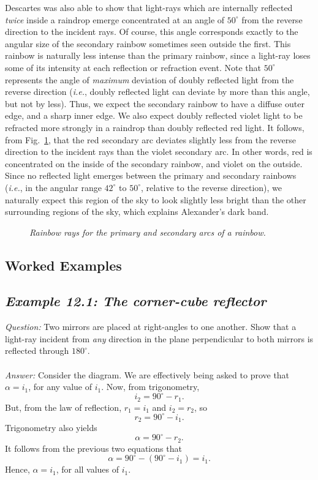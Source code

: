 Descartes was also able to show that light-rays which are
internally  reflected
{\em twice} inside a raindrop emerge concentrated at an
angle of $50^\circ$ from  the reverse direction to the incident
 rays. Of course,
this angle corresponds exactly to the angular size of the secondary
rainbow sometimes seen outside the first. This rainbow
is naturally less intense than the primary rainbow, since a
light-ray  loses some of its intensity at each reflection
or refraction event. Note that $50^\circ$ represents the
angle of {\em maximum}\/ deviation of doubly reflected light
from the reverse direction  ({\em i.e.}, doubly reflected
light can deviate by more than this angle, but not by less). Thus,
we expect the secondary rainbow to have a diffuse outer edge, and
a sharp inner edge. We  also expect doubly reflected violet light to be
refracted more strongly in a raindrop than 
doubly reflected red light. It follows, from Fig.~\ref{f12.15},
 that the red secondary arc deviates slightly less
from the reverse direction to the incident
 rays than the violet secondary arc.
In other words, red is concentrated on the inside of the
secondary rainbow, and violet  on the outside.
Since no reflected light emerges between the primary and secondary
rainbows ({\em i.e.}, in the angular range $42^\circ$ to $50^\circ$,
relative to the reverse direction),
 we naturally expect this region of the sky to look
slightly less bright than the other surrounding regions of the sky,
which explains Alexander's dark band.

\begin{figure}
\epsfysize=3.5in
\centerline{}
\caption{\em Rainbow rays for the primary and secondary arcs of a rainbow.}\label{f12.15}
\end{figure}

\subsection{Worked Examples}
\subsection*{\em Example 12.1: The corner-cube reflector}
\begin{figure*}[h]
\epsfysize=3in
\centerline{}
\end{figure*}
{\em Question:} Two mirrors are placed at right-angles to one another. Show
that a light-ray incident from {\em any}\/ direction
in the plane perpendicular to both mirrors is reflected
through $180^\circ$.\\
~\\
{\em Answer:} Consider the diagram. We are effectively being asked to prove that
$\alpha=i_1$, for any value of $i_1$. Now, from trigonometry,
$$
i_2 = 90^\circ - r_1.
$$
But, from the law of reflection, $r_1=i_1$ and $i_2=r_2$, so
$$
r_2=90^\circ - i_1.
$$
Trigonometry also yields 
$$
\alpha = 90^\circ - r_2.
$$
It follows from the previous two equations that
$$
\alpha = 90^\circ-(90^\circ - i_1) = i_1.
$$
Hence, $\alpha = i_1$, for all values of $i_1$. 

